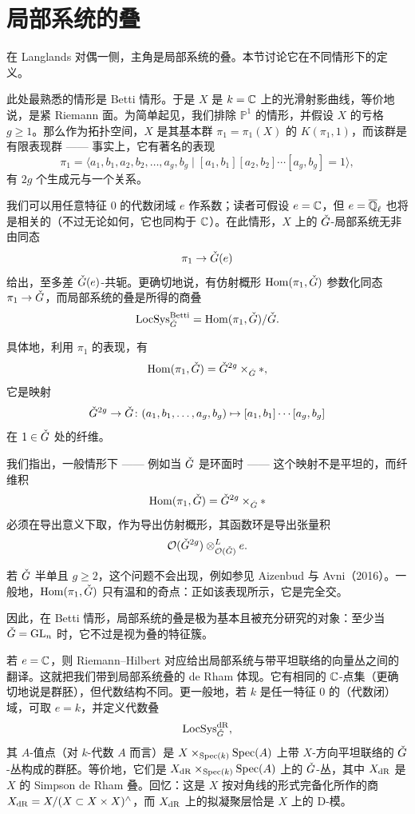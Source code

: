 \section{局部系统的叠}

在 Langlands 对偶一侧，主角是局部系统的叠。本节讨论它在不同情形下的定义。

此处最熟悉的情形是 Betti 情形。于是 $X$ 是 $k=\mathbb{C}$ 上的光滑射影曲线，等价地说，是紧 Riemann 面。为简单起见，我们排除 $\mathbb{P}^1$ 的情形，并假设 $X$ 的亏格 $g\ge 1$。那么作为拓扑空间，$X$ 是其基本群 $\pi_1=\pi_1(X)$ 的 $K(\pi_1,1)$，而该群是有限表现群 —— 事实上，它有著名的表现
\[
\pi_1=\langle a_1,b_1,a_2,b_2,\dots,a_g,b_g\mid [a_1,b_1][a_2,b_2]\cdots[a_g,b_g]=1\rangle,
\]
有 $2g$ 个生成元与一个关系。

我们可以用任意特征 $0$ 的代数闭域 $e$ 作系数；读者可假设 $e=\mathbb{C}$，但 $e=\overline{\mathbb{Q}}_{\ell}$ 也将是相关的（不过无论如何，它也同构于 $\mathbb{C}$）。在此情形，$X$ 上的 $\check{G}$-局部系统无非由同态
\[
\pi_1\to\check{G}(e)
\]
给出，至多差 $\check{G}(e)$-共轭。更确切地说，有仿射概形 $\operatorname{Hom}(\pi_1,\check{G})$ 参数化同态 $\pi_1\to\check{G}$，而局部系统的叠是所得的商叠
\[
\operatorname{LocSys}^{\mathrm{Betti}}_{\check{G}}=\operatorname{Hom}(\pi_1,\check{G})/\check{G}.
\]

具体地，利用 $\pi_1$ 的表现，有
\[
\operatorname{Hom}(\pi_1,\check{G})=\check{G}^{2g}\times_{\check{G}}*,
\]
它是映射
\[
\check{G}^{2g}\to\check{G}\colon (a_1,b_1,\dots,a_g,b_g)\mapsto [a_1,b_1]\cdots[a_g,b_g]
\]
在 $1\in\check{G}$ 处的纤维。

我们指出，一般情形下 —— 例如当 $\check{G}$ 是环面时 —— 这个映射不是平坦的，而纤维积
\[
\operatorname{Hom}(\pi_1,\check{G})=\check{G}^{2g}\times_{\check{G}}*
\]
必须在导出意义下取，作为导出仿射概形，其函数环是导出张量积
\[
\mathcal{O}(\check{G}^{2g})\otimes^L_{\mathcal{O}(\check{G})}e.
\]

若 $\check{G}$ 半单且 $g\ge 2$，这个问题不会出现，例如参见 Aizenbud 与 Avni（2016）。一般地，$\operatorname{Hom}(\pi_1,\check{G})$ 只有温和的奇点：正如该表现所示，它是完全交。

因此，在 Betti 情形，局部系统的叠是极为基本且被充分研究的对象：至少当 $\check{G}=\mathrm{GL}_n$ 时，它不过是视为叠的特征簇。

若 $e=\mathbb{C}$，则 Riemann--Hilbert 对应给出局部系统与带平坦联络的向量丛之间的翻译。这就把我们带到局部系统叠的 de Rham 体现。它有相同的 $\mathbb{C}$-点集（更确切地说是群胚），但代数结构不同。更一般地，若 $k$ 是任一特征 $0$ 的（代数闭）域，可取 $e=k$，并定义代数叠
\[
\operatorname{LocSys}^{\mathrm{dR}}_{\check{G}},
\]
其 $A$-值点（对 $k$-代数 $A$ 而言）是 $X\times_{\operatorname{Spec}(k)}\operatorname{Spec}(A)$ 上带 $X$-方向平坦联络的 $\check{G}$-丛构成的群胚。等价地，它们是 $X_{\mathrm{dR}}\times_{\operatorname{Spec}(k)}\operatorname{Spec}(A)$ 上的 $\check{G}$-丛，其中 $X_{\mathrm{dR}}$ 是 $X$ 的 Simpson de Rham 叠。回忆：这是 $X$ 按对角线的形式完备化所作的商 $X_{\mathrm{dR}}=X/(X\subset X\times X)^{\wedge}$，而 $X_{\mathrm{dR}}$ 上的拟凝聚层恰是 $X$ 上的 D-模。

